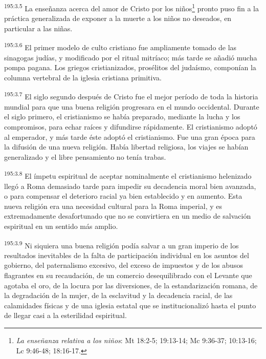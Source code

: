 \par 
\textsuperscript{195:3.5} La enseñanza acerca del amor de Cristo por los niños\footnote{\textit{La enseñanza relativa a los niños}: Mt 18:2-5; 19:13-14; Mc 9:36-37; 10:13-16; Lc 9:46-48; 18:16-17.} pronto puso fin a la práctica generalizada de exponer a la muerte a los niños no deseados, en particular a las niñas.

\par 
\textsuperscript{195:3.6} El primer modelo de culto cristiano fue ampliamente tomado de las sinagogas judías, y modificado por el ritual mitríaco; más tarde se añadió mucha pompa pagana. Los griegos cristianizados, prosélitos del judaísmo, componían la columna vertebral de la iglesia cristiana primitiva.

\par 
\textsuperscript{195:3.7} El siglo segundo después de Cristo fue el mejor período de toda la historia mundial para que una buena religión progresara en el mundo occidental. Durante el siglo primero, el cristianismo se había preparado, mediante la lucha y los compromisos, para echar raíces y difundirse rápidamente. El cristianismo adoptó al emperador, y más tarde éste adoptó el cristianismo. Fue una gran época para la difusión de una nueva religión. Había libertad religiosa, los viajes se habían generalizado y el libre pensamiento no tenía trabas.

\par 
\textsuperscript{195:3.8} El ímpetu espiritual de aceptar nominalmente el cristianismo helenizado llegó a Roma demasiado tarde para impedir su decadencia moral bien avanzada, o para compensar el deterioro racial ya bien establecido y en aumento. Esta nueva religión era una necesidad cultural para la Roma imperial, y es extremadamente desafortunado que no se convirtiera en un medio de salvación espiritual en un sentido más amplio.

\par 
\textsuperscript{195:3.9} Ni siquiera una buena religión podía salvar a un gran imperio de los resultados inevitables de la falta de participación individual en los asuntos del gobierno, del paternalismo excesivo, del exceso de impuestos y de los abusos flagrantes en su recaudación, de un comercio desequilibrado con el Levante que agotaba el oro, de la locura por las diversiones, de la estandarización romana, de la degradación de la mujer, de la esclavitud y la decadencia racial, de las calamidades físicas y de una iglesia estatal que se institucionalizó hasta el punto de llegar casi a la esterilidad espiritual.

